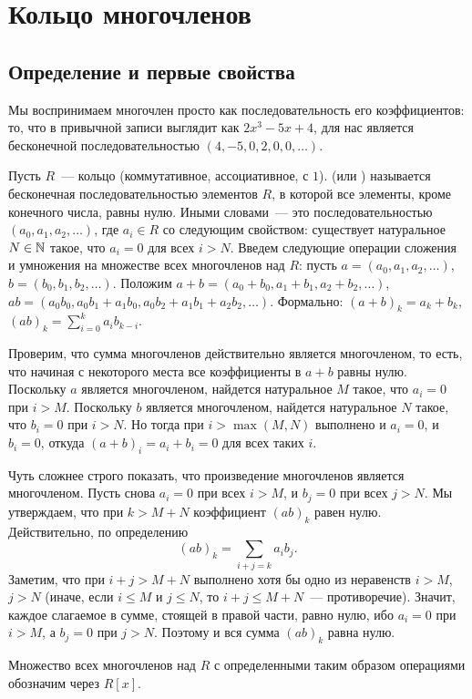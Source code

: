 \section{Кольцо многочленов}

\subsection{Определение и первые свойства}


Мы воспринимаем многочлен просто как последовательность его
коэффициентов: то, что в привычной записи выглядит как
$2x^3-5x+4$, для нас является бесконечной последовательностью
$(4,-5,0,2,0,0,\dots)$.

\begin{definition}
Пусть $R$~--- кольцо (коммутативное, ассоциативное, с $1$).
 (или
) называется бесконечная
последовательностью элементов $R$, в которой все элементы, кроме
конечного числа, равны нулю. Иными словами~--- это последовательностью
$(a_0,a_1,a_2,\dots)$, где $a_i\in R$ со следующим свойством:
существует натуральное $N\in\mathbb N$ такое, что $a_i=0$ для всех $i>N$.
Введем следующие операции сложения и умножения на множестве всех
многочленов над $R$:
пусть $a=(a_0,a_1,a_2,\dots)$, $b=(b_0,b_1,b_2,\dots)$.
Положим $a+b=(a_0+b_0,a_1+b_1,a_2+b_2,\dots)$,
$ab=(a_0b_0,a_0b_1+a_1b_0,a_0b_2+a_1b_1+a_2b_2,\dots)$.
Формально: $(a+b)_k=a_k+b_k$, $(ab)_k=\sum_{i=0}^ka_ib_{k-i}$.

Проверим, что сумма многочленов действительно является многочленом, то
есть, что начиная с некоторого места все коэффициенты в $a+b$ равны
нулю. Поскольку $a$ является многочленом, найдется натуральное $M$
такое, что $a_i=0$ при $i>M$. Поскольку $b$ является многочленом,
найдется натуральное $N$ такое, что $b_i=0$ при $i>N$. Но тогда при
$i > \max(M,N)$ выполнено и $a_i=0$, и $b_i=0$, откуда
$(a+b)_i = a_i + b_i = 0$ для всех таких $i$.

Чуть сложнее строго показать, что произведение многочленов является
многочленом. Пусть снова $a_i=0$ при всех $i>M$, и $b_j=0$ при всех
$j>N$. Мы утверждаем, что при $k > M+N$ коэффициент
$(ab)_k$ равен нулю. Действительно, по определению
$$(ab)_k = \sum_{i+j = k}a_ib_j.$$
Заметим, что при $i+j>M+N$ выполнено хотя бы одно из неравенств $i>M$,
$j>N$ (иначе, если $i\leq M$ и $j\leq N$, то $i+j\leq M+N$~---
противоречие). Значит, каждое слагаемое в сумме, стоящей в правой
части, равно нулю, ибо $a_i = 0$ при $i>M$, а $b_j=0$ при
$j>N$. Поэтому и вся сумма $(ab)_k$ равна нулю.

Множество всех многочленов над $R$ с определенными таким образом
операциями обозначим через $R[x]$.
\end{definition}

